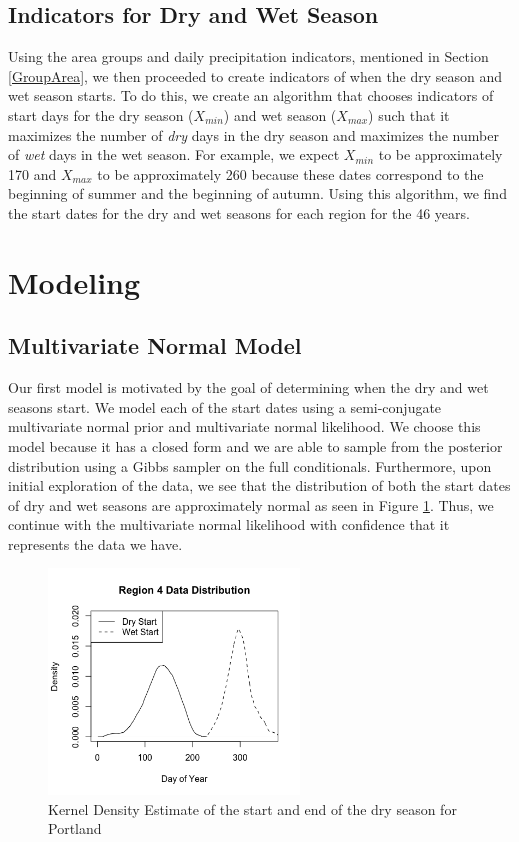 \documentclass{article}
\begin{document}
\subsection{Indicators for Dry and Wet Season}
Using the area groups and daily precipitation indicators, mentioned in Section \ref{GroupArea}, we then proceeded to create indicators of when the dry season and wet season starts. To do this, we create an algorithm that chooses indicators of start days for  the dry season ($X_{min}$) and wet season ($X_{max}$) such that it maximizes the number of \textit{dry} days in the dry season and maximizes the number of \textit{wet} days in the wet season. For example, we expect $X_{min}$ to be approximately 170 and $X_{max}$ to be approximately 260 because these dates correspond to the beginning of summer and the beginning of autumn. Using this algorithm, we find the start dates for the dry and wet seasons for each region for the 46 years.


\section{Modeling}
\subsection{Multivariate Normal Model}
Our first model is motivated by the goal of determining when the dry and wet seasons start. We model each of the start dates using a semi-conjugate multivariate normal prior and multivariate normal likelihood. We choose this model because it has a closed form and we are able to sample from the posterior distribution using a Gibbs sampler on the full conditionals. Furthermore, upon initial exploration of the data, we see that the distribution of both the start dates of dry and wet seasons are approximately normal as seen in Figure \ref{PDXexample}. Thus, we continue with the multivariate normal likelihood with confidence that it represents the data we have. 

\begin{figure}[H]
\includegraphics[width = .4\textwidth, height = 6cm]{Area4DataDistribution}
\caption{Kernel Density Estimate of the start and end of the dry season for Portland}
\label{PDXexample}
\end{figure}
\end{document}
